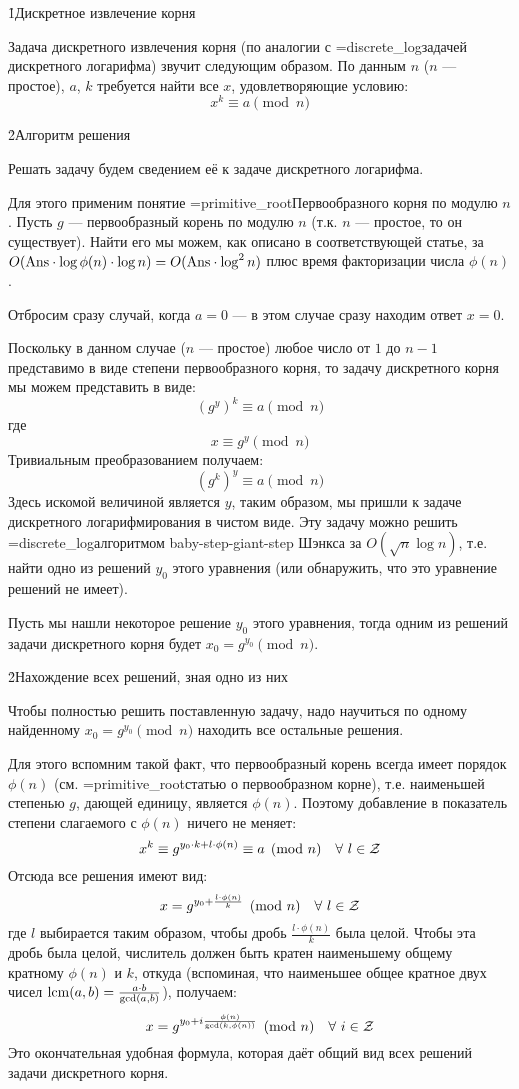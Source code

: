 \h1{Дискретное извлечение корня}

Задача дискретного извлечения корня (по аналогии с \algohref=discrete_log{задачей дискретного логарифма}) звучит следующим образом. По данным $n$ ($n$ --- простое), $a$, $k$ требуется найти все $x$, удовлетворяющие условию:
$$ x^k \equiv a \pmod{n} $$

\h2{Алгоритм решения}

Решать задачу будем сведением её к задаче дискретного логарифма.

Для этого применим понятие \algohref=primitive_root{Первообразного корня по модулю $n$}. Пусть $g$ --- первообразный корень по модулю $n$ (т.к. $n$ --- простое, то он существует). Найти его мы можем, как описано в соответствующей статье, за $O( {\rm Ans} \cdot \log \phi(n) \cdot \log n) = O( {\rm Ans} \cdot \log^2 n)$ плюс время факторизации числа $\phi(n)$.

Отбросим сразу случай, когда $a=0$ --- в этом случае сразу находим ответ $x=0$.

Поскольку в данном случае ($n$ --- простое) любое число от $1$ до $n-1$ представимо в виде степени первообразного корня, то задачу дискретного корня мы можем представить в виде:
$$ {\left( g^y \right)}^k \equiv a \pmod{n} $$
где
$$ x \equiv g^y \pmod{n} $$
Тривиальным преобразованием получаем:
$$ {\left( g^k \right)}^y \equiv a \pmod{n} $$
Здесь искомой величиной является $y$, таким образом, мы пришли к задаче дискретного логарифмирования в чистом виде. Эту задачу можно решить \algohref=discrete_log{алгоритмом baby-step-giant-step Шэнкса} за $O( \sqrt{n} \log n )$, т.е. найти одно из решений $y_0$ этого уравнения (или обнаружить, что это уравнение решений не имеет).

Пусть мы нашли некоторое решение $y_0$ этого уравнения, тогда одним из решений задачи дискретного корня будет $x_0 = g^{y_0} \pmod{n}$.

\h2{Нахождение всех решений, зная одно из них}

Чтобы полностью решить поставленную задачу, надо научиться по одному найденному $x_0 = g^{y_0} \pmod{n}$ находить все остальные решения.

Для этого вспомним такой факт, что первообразный корень всегда имеет порядок $\phi(n)$ (см. \algohref=primitive_root{статью о первообразном корне}), т.е. наименьшей степенью $g$, дающей единицу, является $\phi(n)$. Поэтому добавление в показатель степени слагаемого с $\phi(n)$ ничего не меняет:
$$ x^k \equiv g^{ y_0 \cdot k + l \cdot \phi(n) } \equiv a \pmod{n}\ \ \ \forall\ l \in {\cal Z} $$
Отсюда все решения имеют вид:
$$ x = g^{ y_0 + \frac{ l \cdot \phi(n) }{ k } } \pmod{n}\ \ \ \forall\ l \in {\cal Z} $$
где $l$ выбирается таким образом, чтобы дробь $\frac{ l \cdot \phi(n) }{ k }$ была целой. Чтобы эта дробь была целой, числитель должен быть кратен наименьшему общему кратному $\phi(n)$ и $k$, откуда (вспоминая, что наименьшее общее кратное двух чисел ${\rm lcm}(a,b) = \frac{ a \cdot b }{ {\rm gcd}(a,b) }$), получаем:
$$ x = g^{ y_0 + i \frac{ \phi(n) }{ {\rm gcd}(k,\phi(n)) } } \pmod{n}\ \ \ \forall\ i \in {\cal Z} $$
Это окончательная удобная формула, которая даёт общий вид всех решений задачи дискретного корня.

